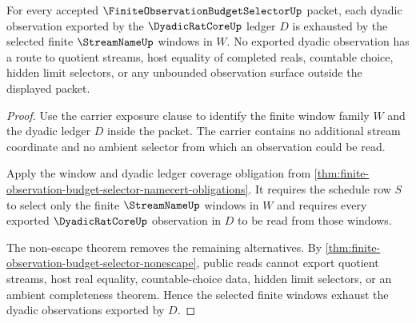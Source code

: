 \begin{theorem}
\label{thm:finite-observation-budget-selector-dyadic-window-exhaustion}
For every accepted $\FiniteObservationBudgetSelectorUp$ packet, each dyadic observation exported by the $\DyadicRatCoreUp$ ledger $D$ is exhausted by the selected finite $\StreamNameUp$ windows in $W$. No exported dyadic observation has a route to quotient streams, host equality of completed reals, countable choice, hidden limit selectors, or any unbounded observation surface outside the displayed packet.
\end{theorem}
\begin{proof}
Use the carrier exposure clause to identify the finite window family $W$ and the dyadic ledger $D$ inside the packet. The carrier contains no additional stream coordinate and no ambient selector from which an observation could be read.

Apply the window and dyadic ledger coverage obligation from \autoref{thm:finite-observation-budget-selector-namecert-obligations}. It requires the schedule row $S$ to select only the finite $\StreamNameUp$ windows in $W$ and requires every exported $\DyadicRatCoreUp$ observation in $D$ to be read from those windows.

The non-escape theorem removes the remaining alternatives. By \autoref{thm:finite-observation-budget-selector-nonescape}, public reads cannot export quotient streams, host real equality, countable-choice data, hidden limit selectors, or an ambient completeness theorem. Hence the selected finite windows exhaust the dyadic observations exported by $D$.
\end{proof}

